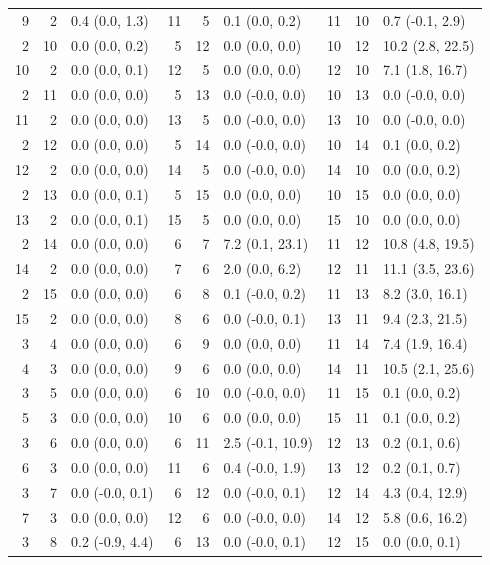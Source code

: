 \begin{table}
\begin{tabular}{|rrl||rrl||rrl|}
 9 & 2 & 0.4 (0.0, 1.3) & 11 & 5 & 0.1 (0.0, 0.2) & 11 & 10 & 0.7 (-0.1, 2.9) \\
 2 & 10 & 0.0 (0.0, 0.2) & 5 & 12 & 0.0 (0.0, 0.0) & 10 & 12 & 10.2 (2.8, 22.5) \\
 10 & 2 & 0.0 (0.0, 0.1) & 12 & 5 & 0.0 (0.0, 0.0) & 12 & 10 & 7.1 (1.8, 16.7) \\
 2 & 11 & 0.0 (0.0, 0.0) & 5 & 13 & 0.0 (-0.0, 0.0) & 10 & 13 & 0.0 (-0.0, 0.0) \\
 11 & 2 & 0.0 (0.0, 0.0) & 13 & 5 & 0.0 (-0.0, 0.0) & 13 & 10 & 0.0 (-0.0, 0.0) \\
 2 & 12 & 0.0 (0.0, 0.0) & 5 & 14 & 0.0 (-0.0, 0.0) & 10 & 14 & 0.1 (0.0, 0.2) \\
 12 & 2 & 0.0 (0.0, 0.0) & 14 & 5 & 0.0 (-0.0, 0.0) & 14 & 10 & 0.0 (0.0, 0.2) \\
 2 & 13 & 0.0 (0.0, 0.1) & 5 & 15 & 0.0 (0.0, 0.0) & 10 & 15 & 0.0 (0.0, 0.0) \\
 13 & 2 & 0.0 (0.0, 0.1) & 15 & 5 & 0.0 (0.0, 0.0) & 15 & 10 & 0.0 (0.0, 0.0) \\
 2 & 14 & 0.0 (0.0, 0.0) & 6 & 7 & 7.2 (0.1, 23.1) & 11 & 12 & 10.8 (4.8, 19.5) \\
 14 & 2 & 0.0 (0.0, 0.0) & 7 & 6 & 2.0 (0.0, 6.2) & 12 & 11 & 11.1 (3.5, 23.6) \\
 2 & 15 & 0.0 (0.0, 0.0) & 6 & 8 & 0.1 (-0.0, 0.2) & 11 & 13 & 8.2 (3.0, 16.1) \\
 15 & 2 & 0.0 (0.0, 0.0) & 8 & 6 & 0.0 (-0.0, 0.1) & 13 & 11 & 9.4 (2.3, 21.5) \\
 3 & 4 & 0.0 (0.0, 0.0) & 6 & 9 & 0.0 (0.0, 0.0) & 11 & 14 & 7.4 (1.9, 16.4) \\
 4 & 3 & 0.0 (0.0, 0.0) & 9 & 6 & 0.0 (0.0, 0.0) & 14 & 11 & 10.5 (2.1, 25.6) \\
 3 & 5 & 0.0 (0.0, 0.0) & 6 & 10 & 0.0 (-0.0, 0.0) & 11 & 15 & 0.1 (0.0, 0.2) \\
 5 & 3 & 0.0 (0.0, 0.0) & 10 & 6 & 0.0 (0.0, 0.0) & 15 & 11 & 0.1 (0.0, 0.2) \\
 3 & 6 & 0.0 (0.0, 0.0) & 6 & 11 & 2.5 (-0.1, 10.9) & 12 & 13 & 0.2 (0.1, 0.6) \\
 6 & 3 & 0.0 (0.0, 0.0) & 11 & 6 & 0.4 (-0.0, 1.9) & 13 & 12 & 0.2 (0.1, 0.7) \\
 3 & 7 & 0.0 (-0.0, 0.1) & 6 & 12 & 0.0 (-0.0, 0.1) & 12 & 14 & 4.3 (0.4, 12.9) \\
 7 & 3 & 0.0 (0.0, 0.0) & 12 & 6 & 0.0 (-0.0, 0.0) & 14 & 12 & 5.8 (0.6, 16.2) \\
 3 & 8 & 0.2 (-0.9, 4.4) & 6 & 13 & 0.0 (-0.0, 0.1) & 12 & 15 & 0.0 (0.0, 0.1) \\

\end{tabular}
\end{table}
